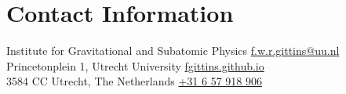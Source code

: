 \section{Contact Information}

Institute for Gravitational and Subatomic Physics
\hfill \href{mailto:f.w.r.gittins@uu.nl}{f.w.r.gittins@uu.nl} \\
%
Princetonplein 1, Utrecht University
\hfill \href{https://fgittins.github.io}{fgittins.github.io} \\
%
3584 CC Utrecht, The Netherlands
\hfill \href{tel:+31 6 57 918 906}{+31 6 57 918 906}



